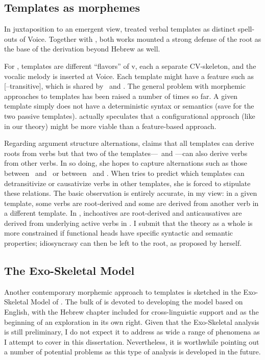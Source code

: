 	\subsection{Templates as morphemes \citep{arad05}} \label{syn:other-root:arad}
In juxtaposition to an emergent view, \cite{arad05} treated verbal templates as distinct spell-outs of Voice. Together with \cite{arad03}, both works mounted a strong defense of the root as the base of the derivation beyond Hebrew as well.

For \citeauthor{arad05}, templates are different ``flavors'' of v, each a separate CV-skeleton, and the vocalic melody is inserted at Voice. Each template might have a feature such as [--transitive], which is shared by \tnif~and \thit. The general problem with morphemic approaches to templates has been raised a number of times so far. A given template simply does not have a deterministic syntax or semantics (save for the two passive templates). \citet[198]{arad05} actually speculates that a configurational approach (like in our theory) might be more viable than a feature-based approach. 

Regarding argument structure alternations, \cite{arad05} claims that all templates can derive roots from verbs but that two of the templates---\tnif~and \thit---can also derive verbs from other verbs. In so doing, she hopes to capture alternations such as those between \tkal~and \tnif~or between \tpie~and \thit.  When \citeauthor{arad05} tries to predict which templates can detransitivize or causativize verbs in other templates, she is forced to stipulate these relations. The basic observation is entirely accurate, in my view: in a given template, some verbs are root-derived and some are derived from another verb in a different template. In \tnif, inchoatives are root-derived and anticausatives are derived from underlying active verbs in \tkal. I submit that the theory as a whole is more constrained if functional heads have specific syntactic and semantic properties; idiosyncrasy can then be left to the root, as proposed by \citeauthor{arad05} herself.
	
	\subsection{The Exo-Skeletal Model \citep{borer13oup,borer15roots}} \label{syn:other-root:borer}
Another contemporary morphemic approach to templates is sketched in the Exo-Skeletal Model of \citet[Ch.~11]{borer13oup}. The bulk of \cite{borer13oup} is devoted to developing the model based on English, with the Hebrew chapter included for cross-linguistic support and as the beginning of an exploration in its own right. Given that the Exo-Skeletal analysis is still preliminary, I do not expect it to address as wide a range of phenomena as I attempt to cover in this dissertation. Nevertheless, it is worthwhile pointing out a number of potential problems as this type of analysis is developed in the future.

